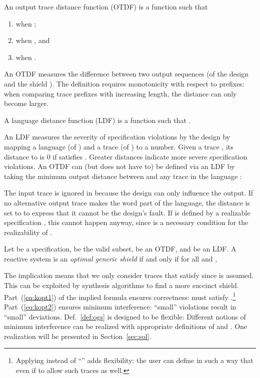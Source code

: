 \documentclass{llncs}
\begin{document}
\begin{definition}
An output trace distance function (OTDF) is a function  such 
that
\begin{enumerate}
\item  
      when ; 
\item  
      when , and
\item  
      when .
\end{enumerate}
\end{definition}

\noindent
An OTDF measures the difference between two output sequences (of the 
design  and the shield ).  The definition requires 
monotonicity with respect to prefixes: when comparing trace prefixes 
with increasing length, the distance can only become larger.  

\begin{definition}
A language distance function (LDF) is a function  such that 
.
\end{definition}

\noindent
An LDF measures the severity of specification violations by the design 
by mapping a language (of ) and a trace (of ) to a 
number.  Given a trace , its distance to 
 is 0 if  satisfies .  Greater distances 
indicate more severe specification violations.  An OTDF can (but does 
not have to) be defined via an LDF by taking the minimum output distance 
between  and any trace in the 
language :

The input trace is ignored in  because the design  can 
only influence the output.  If no alternative output trace makes the 
word part of the language, the distance is set to  to express that it 
cannot be the design's fault. If  is defined by a realizable 
specification , this cannot happen anyway, since  is a 
necessary condition for the realizability of .

\begin{definition}
\label{def:ogs}
Let  be a specification,  be the valid 
subset,  be an OTDF, and  be an LDF.  A reactive system 
 is an \emph{optimal generic shield} if and only if for all 
 and , 

\end{definition}


\noindent
The implication means that we only consider traces that satisfy  
since  is assumed.   This can be exploited by 
synthesis algorithms to find a more succinct shield. 
Part~(\ref{eq:kopt1}) of the implied formula ensures correctness: 
 must satisfy .\footnote{Applying  
instead of ``'' adds flexibility: the user can 
define  in such a way that  even if 
 to allow such traces as well.} 
Part~(\ref{eq:kopt2}) ensures minimum interference: ``small'' violations 
result in ``small'' deviations. Def.~\ref{def:ogs} is designed to be 
flexible: Different notions of minimum interference can be realized with 
appropriate definitions of  and .  One realization will 
be presented in Section~\ref{sec:sol}.
\end{document}
